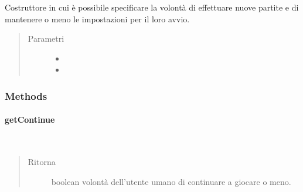 \documentclass[letterpaper,10pt,italian,openany,oneside]{sphinxmanual}
\begin{document}
\begin{fulllineitems}
\label{\detokenize{source/it/unicam/cs/pa/mastermind/gamecore/StartupSettings:it.unicam.cs.pa.mastermind.gamecore.StartupSettings.StartupSettings(boolean, boolean)}}
Costruttore in cui è possibile specificare la volontà di effettuare nuove partite e di mantenere o meno le impostazioni per il loro avvio.
\begin{quote}\begin{description}
\item[{Parametri}] \leavevmode\begin{itemize}
\item {} 
 \textendash{} 

\item {} 
 \textendash{} 

\end{itemize}

\end{description}\end{quote}

\end{fulllineitems}



\subsubsection{Methods}
\label{\detokenize{source/it/unicam/cs/pa/mastermind/gamecore/StartupSettings:methods}}

\paragraph{getContinue}
\label{\detokenize{source/it/unicam/cs/pa/mastermind/gamecore/StartupSettings:getcontinue}}

\begin{fulllineitems}
\label{\detokenize{source/it/unicam/cs/pa/mastermind/gamecore/StartupSettings:it.unicam.cs.pa.mastermind.gamecore.StartupSettings.getContinue()}}~\begin{quote}\begin{description}
\item[{Ritorna}] \leavevmode
boolean volontà dell’utente umano di continuare a giocare o meno.

\end{description}\end{quote}

\end{fulllineitems}
\end{document}
